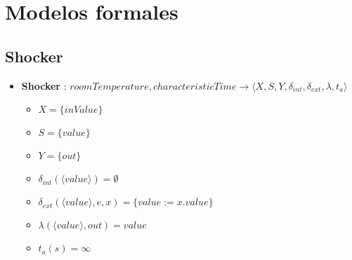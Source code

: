 \section{Modelos formales}
\subsection{Shocker}
\begin{itemize}

	\item \textbf{Shocker} : $ roomTemperature, characteristicTime \rightarrow \langle X, S, Y, \delta_{int}, \delta_{ext}, \lambda, t_{a} \rangle$ \newline
	\begin{itemize}
		\item $ X = \{ inValue \} $ \newline
		\item $ S = \{ value \} $ \newline
		\item $ Y = \{ out \} $ \newline
		\item $ \delta_{int}(\langle value \rangle) = \emptyset $ \newline
		\item $ \delta_{ext} (\langle value \rangle, e, x)= \{ value := x.value \} $ \newline
		\item $ \lambda(\langle value \rangle, out) = value $ \newline
		\item $ t_{a}(s) = \infty $ 
	\end{itemize}
\end{itemize}